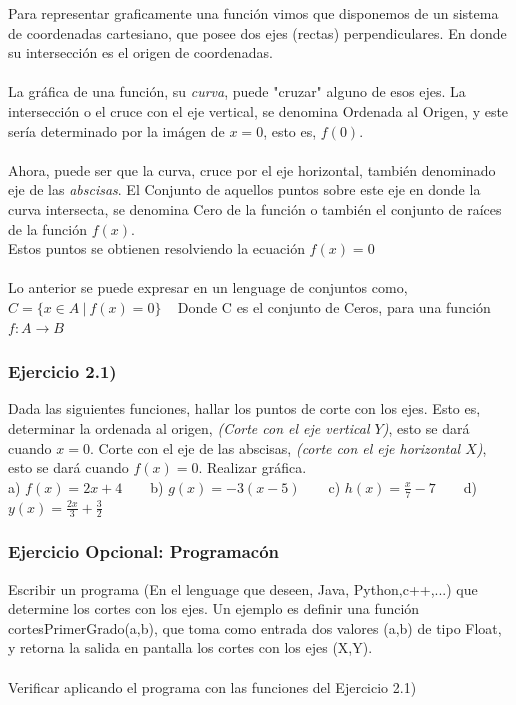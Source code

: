 \documentclass[11pt, a4paper]{article}
\begin{document}
Para representar graficamente una funci\'on vimos que disponemos de un sistema de coordenadas cartesiano, que posee dos ejes (rectas) perpendiculares. En donde su intersecci\'on es el origen de coordenadas. \\ \\ 
La gr\'afica de una funci\'on, su \textit{curva}, puede  "cruzar" alguno de esos ejes. La intersecci\'on o el cruce con el eje vertical, se denomina {\color{blue} Ordenada al Origen}, y este ser\'ia determinado por la im\'agen de $x=0$, esto es, $f(0)$. \\ \\ 
Ahora, puede ser que la curva, cruce por el eje horizontal, tambi\'en denominado eje de las \textit{abscisas}. El Conjunto de aquellos puntos sobre este eje en donde la curva intersecta, se denomina {\color{blue}  Cero de la funci\'on } o tambi\'en el conjunto de {\color{blue}ra\'ices de la funci\'on} $f(x)$.\\ Estos puntos se obtienen resolviendo la ecuaci\'on $ f(x) = 0 $ \\ \\ Lo anterior se puede expresar en un lenguage de conjuntos como, \\ 
$ C = \{ x \in A ~|~ f(x) = 0 \} $ ~ Donde C es el conjunto de Ceros, para una funci\'on $f: A \to B$



\subsubsection*{ Ejercicio 2.1) } Dada las siguientes funciones, hallar los puntos de corte con los ejes. Esto es, determinar la ordenada al origen, \textit{(Corte con el eje vertical $Y$)}, esto se dar\'a cuando $x=0$. Corte con el eje de las abscisas, \textit{(corte con el eje horizontal $X$)}, esto se dar\'a cuando $f(x) = 0$. Realizar gr\'afica.  \\ 
a) $f(x) = 2x + 4 $ ~ ~ b) $g(x) = -3(x - 5) $ ~ ~ c) $\displaystyle h(x) = \frac{x}{7} - 7 $ ~ ~
d) $\displaystyle y(x) = \frac{2x}{3} + \frac{3}{2} $ \\ 



\subsubsection*{Ejercicio Opcional: Programac\'on}
Escribir un programa (En el lenguage que deseen, Java, Python,c++,...) que determine los cortes con los ejes. Un ejemplo es definir una funci\'on \\ {\color{blue}cortesPrimerGrado(a,b)}, que toma como entrada dos valores (a,b) de tipo Float, y retorna la salida en pantalla los cortes con los ejes (X,Y). \\ \\ 
Verificar aplicando el programa con las funciones del Ejercicio 2.1)
\end{document}
